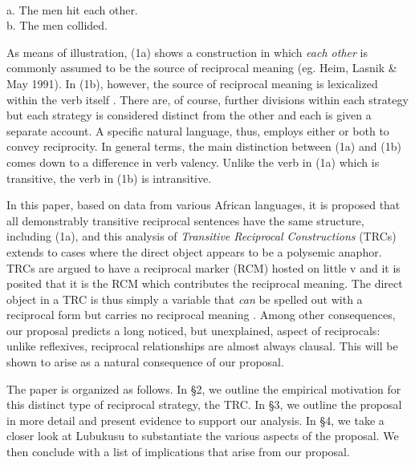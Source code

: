 \setcounter{listWWviiiNumxlileveli}{0}
\begin{listWWviiiNumxlileveli}
\item \ea\label{ex:}
\\
\end{listWWviiiNumxlileveli}
\gll   \textup{a.  }The men hit each other.  \\
\gll \textup{b.  }The men collided.\\
\setcounter{listWWviiiNumxixleveli}{0}
\begin{listWWviiiNumxixleveli}
\begin{styleExample}
As means of illustration, (1a) shows a construction in which \textit{each other} is commonly assumed to be the source of reciprocal meaning (eg. Heim, Lasnik \& May 1991). In (1b), however, the source of reciprocal meaning is lexicalized within the verb itself \citep{Siloni2012}.  There are, of course, further divisions within each strategy but each strategy is considered distinct from the other and each is given a separate account. A specific natural language, thus, employs either or both to convey reciprocity. In general terms, the main distinction between (1a) and (1b) comes down to a difference in verb valency. Unlike the verb in (1a) which is transitive, the verb in (1b) is intransitive.
\end{styleExample}

\begin{styleExample}
  In this paper, based on data from various African languages, it is proposed that all demonstrably transitive reciprocal sentences have the same structure, including (1a), and this analysis of \textit{Transitive Reciprocal Constructions} (TRCs) extends to cases where the direct object appears to be a polysemic anaphor. TRCs are argued to have a reciprocal marker (RCM) hosted on little v and it is posited that it is the RCM which contributes the reciprocal meaning. The direct object in a TRC is thus simply a variable that \textit{can} be spelled out with a reciprocal form but carries no reciprocal meaning \citep{Safir2014}. Among other consequences, our proposal predicts a long noticed, but unexplained, aspect of reciprocals: unlike reflexives, reciprocal relationships are almost always clausal. This will be shown to arise as a natural consequence of our proposal.
\end{styleExample}

\begin{styleExample}
  The paper is organized as follows. In §2, we outline the empirical motivation for this distinct type of reciprocal strategy, the TRC. In §3, we outline the proposal in more detail and present evidence to support our analysis. In §4, we take a closer look at Lubukusu to substantiate the various aspects of the proposal. We then conclude with a list of implications that arise from our proposal.
\end{styleExample}
\end{listWWviiiNumxixleveli}
